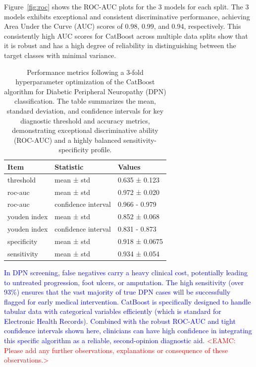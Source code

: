 \documentclass[fleqn,10pt]{wlscirep}
\begin{document}
Figure~\ref{fig:roc} shows the ROC-AUC plots for the 3 models for each split.  The 3 models exhibits exceptional and consistent discriminative performance, achieving Area Under the Curve (AUC) scores of 0.98, 0.99, and 0.94, respectively. This consistently high AUC scores for CatBoost across multiple data splits show that it is robust and has a high degree of reliability in distinguishing between the target classes with minimal variance.

\begin{table}[t]
\centering
\small
\begin{tabular}{lll}
\toprule
Item & Statistic & Values \\
\midrule
threshold & mean ± std & 0.635 ± 0.123 \\
roc-auc & mean ± std & 0.972 ± 0.020 \\
roc-auc  & confidence interval &  0.966 - 0.979 \\
youden index &  mean ± std & 0.852 ± 0.068 \\
youden index &  confidence interval & 0.831 - 0.873 \\
specificity  & mean ± std  &  0.918 ± 0.0675\\
sensitivity  &  mean ± std  & 0.934 ± 0.054 \\
\bottomrule
\end{tabular}
\caption{Performance metrics following a 3-fold hyperparameter optimization of the CatBoost algorithm for Diabetic Peripheral Neuropathy (DPN) classification. The table summarizes the mean, standard deviation, and confidence intervals for key diagnostic threshold and accuracy metrics, demonstrating exceptional discriminative ability (ROC-AUC) and a highly balanced sensitivity-specificity profile.}
\label{tab:hpo}
\end{table}

\textcolor{blue}{In DPN screening, false negatives carry a heavy clinical cost, potentially leading to untreated progression, foot ulcers, or amputation. The high sensitivity (over 93\%) ensures that the vast majority of true DPN cases will be successfully flagged for early medical intervention. CatBoost is specifically designed to handle tabular data with categorical variables efficiently (which is standard for Electronic Health Records). Combined with the robust ROC-AUC and tight confidence intervals shown here, clinicians can have high confidence in integrating this specific algorithm as a reliable, second-opinion diagnostic aid.} \textcolor{red}{<EAMC: Please add any further observations, explanations or consequence of these observations.>}  
\end{document}
